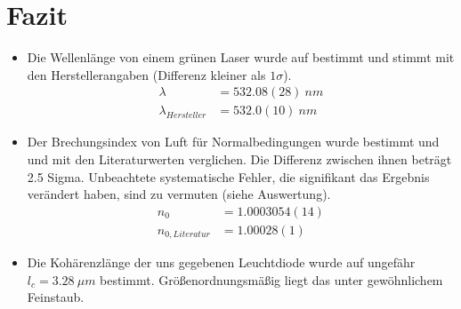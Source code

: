 \documentclass[a4paper,10pt]{article}
\begin{document}
\section{Fazit}
\begin{itemize}
\item Die Wellenlänge von einem grünen Laser wurde auf bestimmt und stimmt mit den Herstellerangaben (Differenz kleiner als \(1\sigma\)).
\begin{align*}
\lambda&=532.08(28)\:nm\\
\lambda_{Hersteller}&=532.0(10)\:nm
\end{align*}
\item Der Brechungsindex von Luft für Normalbedingungen wurde bestimmt und und mit den Literaturwerten verglichen. Die Differenz zwischen ihnen beträgt 2.5 Sigma. Unbeachtete systematische Fehler, die signifikant das Ergebnis verändert haben, sind zu vermuten (siehe Auswertung).
\begin{align*}
n_0&=1.0003054(14) \\
n_{0, Literatur} &=1.00028(1)
\end{align*}
\item Die Kohärenzlänge der uns gegebenen Leuchtdiode wurde auf ungefähr \(l_c  = 3.28\:{\mu m}\) bestimmt. Größenordnungsmäßig liegt das unter gewöhnlichem Feinstaub.
\end{itemize}
\unboldmath
\end{document}
